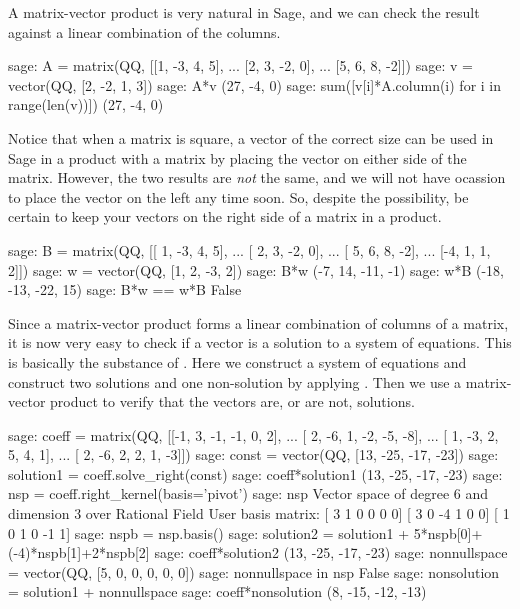 A matrix-vector product is very natural in Sage, and we can check the result against a linear combination of the columns.
%
\begin{sageexample}
sage: A = matrix(QQ, [[1, -3,  4,  5],
...                   [2,  3, -2,  0],
...                   [5,  6,  8, -2]])
sage: v = vector(QQ, [2, -2, 1, 3])
sage: A*v
(27, -4, 0)
sage: sum([v[i]*A.column(i) for i in range(len(v))])
(27, -4, 0)
\end{sageexample}
%
Notice that when a matrix is square, a vector of the correct size can be used in Sage in a product with a matrix by placing the vector on either side of the matrix.  However, the two results are \emph{not} the same, and we will not have ocassion to place the vector on the left any time soon.  So, despite the possibility, be certain to keep your vectors on the right side of a matrix in a product.
%
\begin{sageexample}
sage: B = matrix(QQ, [[ 1, -3,  4,  5],
...                   [ 2,  3, -2,  0],
...                   [ 5,  6,  8, -2],
...                   [-4,  1,  1,  2]])
sage: w = vector(QQ, [1, 2, -3, 2])
sage: B*w
(-7, 14, -11, -1)
sage: w*B
(-18, -13, -22, 15)
sage: B*w == w*B
False
\end{sageexample}
%
Since a matrix-vector product forms a linear combination of columns of a matrix, it is now very easy to check if a vector is a solution to a system of equations.  This is basically the substance of .  Here we construct a system of equations and construct two solutions and one non-solution by applying .  Then we use a matrix-vector product to verify that the vectors are, or are not, solutions.
%
\begin{sageexample}
sage: coeff = matrix(QQ, [[-1,  3, -1, -1,  0,  2],
...                       [ 2, -6,  1, -2, -5, -8],
...                       [ 1, -3,  2,  5,  4,  1],
...                       [ 2, -6,  2,  2,  1, -3]])
sage: const = vector(QQ, [13, -25, -17, -23])
sage: solution1 = coeff.solve_right(const)
sage: coeff*solution1
(13, -25, -17, -23)
sage: nsp = coeff.right_kernel(basis='pivot')
sage: nsp
Vector space of degree 6 and dimension 3 over Rational Field
User basis matrix:
[ 3  1  0  0  0  0]
[ 3  0 -4  1  0  0]
[ 1  0  1  0 -1  1]
sage: nspb = nsp.basis()
sage: solution2 = solution1 + 5*nspb[0]+(-4)*nspb[1]+2*nspb[2]
sage: coeff*solution2
(13, -25, -17, -23)
sage: nonnullspace = vector(QQ, [5, 0, 0, 0, 0, 0])
sage: nonnullspace in nsp
False
sage: nonsolution = solution1 + nonnullspace
sage: coeff*nonsolution
(8, -15, -12, -13)
\end{sageexample}
